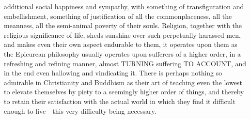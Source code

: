 \documentclass[12pt]{article}
\begin{document}
additional social happiness and sympathy, with something of transfiguration and embellishment, something of justification of all the commonplaceness, all the meanness, all the semi-animal poverty of their souls. Religion, together with the religious significance of life, sheds sunshine over such perpetually harassed men, and makes even their own aspect endurable to them, it operates upon them as the Epicurean philosophy usually operates upon sufferers of a higher order, in a refreshing and refining manner, almost TURNING suffering TO ACCOUNT, and in the end even hallowing and vindicating it. There is perhaps nothing so admirable in Christianity and Buddhism as their art of teaching even the lowest to elevate themselves by piety to a seemingly higher order of things, and thereby to retain their satisfaction with the actual world in which they find it difficult enough to live---this very difficulty being necessary.
\end{document}
